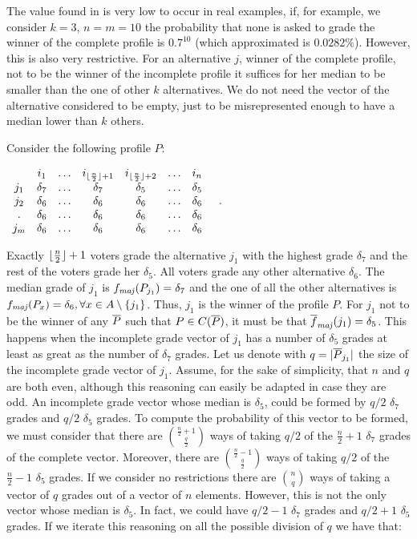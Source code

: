 	The value found in  is very low to occur in real examples, if, for example, we consider $k=3$, $n=m=10$ the probability that none is asked to grade the winner of the complete profile is $0.7^{10}$ (which approximated is $0.0282\%$).
	However, this is also very restrictive. For an alternative $j$, winner of the complete profile, not to be the winner of the incomplete profile it suffices for her median to be smaller than the one of other $k$ alternatives. 
	We do not need the vector of the alternative considered to be empty, just to be misrepresented enough to have a median lower than $k$ others.
	
	\begin{example} \normalfont
		Consider the following profile $P$:
		\begin{center}
			$
			\begin{array}{ccccccc}
					& i_1 & \dots & i_{\lfloor\frac{n}{2}\rfloor + 1} & i_{\lfloor\frac{n}{2}\rfloor + 2} & \dots & i_n \\
				j_1 & \delta_7 & \dots &\delta_7 & \delta_5 & \dots & \delta_5 \\
				j_2 & \delta_6 & \dots &\delta_6 & \delta_6 & \dots & \delta_6 \\
				. & \delta_6 & \dots &\delta_6 & \delta_6 & \dots & \delta_6 \\
				j_m & \delta_6 & \dots &\delta_6 & \delta_6 & \dots & \delta_6 \\
			\end{array} \quad.
			$
		\end{center}	
		Exactly $\lfloor\frac{n}{2}\rfloor + 1$ voters grade the alternative $j_1$ with the highest grade $\delta_7$ and the rest of the voters grade her $\delta_5$. All voters grade any other alternative $\delta_6$.
		The median grade of $j_1$ is $\fmaj(P_{j_1})=\delta_7$ and the one of all the other alternatives is $\fmaj(P_x)=\delta_6, \forall x \in A \setminus \{j_1\}$. Thus, $j_1$ is the winner of the profile $P$.
		For $j_1$ not to be the winner of any $\overline{P}$ such that $P \in C(\overline{P})$, it must be that $\fmajbar(j_1)=\delta_5$. This happens when the incomplete grade vector of $j_1$ has a number of $\delta_5$ grades at least as great as the number of $\delta_7$ grades. 
		Let us denote with $q=|\overline{P}_{j_1}|$ the size of the incomplete grade vector of $j_1$.
		Assume, for the sake of simplicity, that $n$ and $q$ are both even, although this reasoning can easily be adapted in case they are odd.
		An incomplete grade vector whose median is $\delta_5$, could be formed by $q/2$ $\delta_7$ grades and $q/2$ $\delta_5$ grades. To compute the probability of this vector to be formed, we must consider that there are $\binom{\frac{n}{2}+1}{ \frac{q}{2}}$ ways of taking $q/2$ of the $\frac{n}{2}+1$ $\delta_7$ grades of the complete vector. Moreover, there are $\binom{\frac{n}{2}-1}{ \frac{q}{2}}$ ways of taking $q/2$ of the $\frac{n}{2}-1$ $\delta_5$ grades. If we consider no restrictions there are $\binom{n}{q}$ ways of taking a vector of $q$ grades out of a vector of $n$ elements.
		However, this is not the only vector whose median is $\delta_5$. In fact, we could have $q/2-1$ $\delta_7$ grades and $q/2+1$ $\delta_5$ grades. If we iterate this reasoning on all the possible division of $q$ we have that:
	

\end{example}

